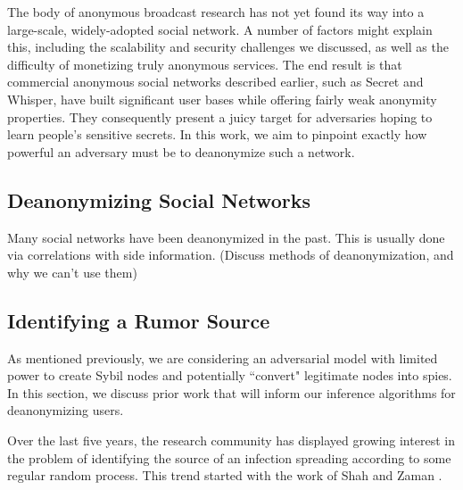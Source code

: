 \documentclass[10pt, twocolumn]{article}
\begin{document}
The body of anonymous broadcast research has not yet found its way into a large-scale, widely-adopted social network. 
A number of factors might explain this, including the scalability and security challenges we discussed, as well as the difficulty of monetizing truly anonymous services.
The end result is that commercial anonymous social networks described earlier, such as Secret and Whisper, have built significant user bases while offering fairly weak anonymity properties.
They consequently present a juicy target for adversaries hoping to learn people's sensitive secrets.
In this work, we aim to pinpoint exactly how powerful an adversary must be to deanonymize such a network.

\subsection{Deanonymizing Social Networks}
Many social networks have been deanonymized in the past.
This is usually done via correlations with side information. (Discuss methods of deanonymization, and why we can't use them)


\subsection{Identifying a Rumor Source}
As mentioned previously, we are considering an adversarial model with limited power to create Sybil nodes and potentially ``convert" legitimate nodes into spies. In this section, we discuss prior work that will inform our inference algorithms for deanonymizing users.

Over the last five years, the research community has displayed growing interest in the problem of identifying the source of an infection spreading according to some regular random process. 
This trend started with the work of Shah and Zaman \cite{shah2011rumors}.

\cite{shah2012rumor}




\end{document}
